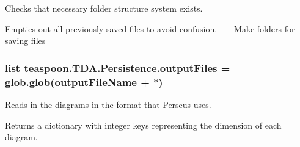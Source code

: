 Checks that necessary folder structure system exists. 

Empties out all previously saved files to avoid confusion. -\/--- Make folders for saving files 
\subsubsection[{\texorpdfstring{output\+Files}{outputFiles}}]{\setlength{\rightskip}{0pt plus 5cm}list teaspoon.\+T\+D\+A.\+Persistence.\+output\+Files = glob.\+glob(output\+File\+Name + \textquotesingle{}$\ast$\textquotesingle{})}\hypertarget{namespaceteaspoon_1_1_t_d_a_1_1_persistence_ae41c85513e98b32d96c75124929c4d2c}{}\label{namespaceteaspoon_1_1_t_d_a_1_1_persistence_ae41c85513e98b32d96c75124929c4d2c}


Reads in the diagrams in the format that Perseus uses. 

Returns a dictionary with integer keys representing the dimension of each diagram. 